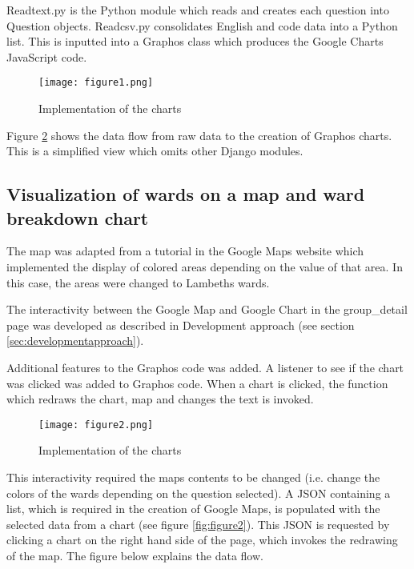 Readtext.py is the Python module which reads and creates each question into Question objects. Readcsv.py consolidates English and code data into a Python list. This is inputted into a Graphos class which produces the Google Charts JavaScript code. 

\begin{figure}[h]
\centering
\texttt{[image: figure1.png]}
\caption{Implementation of the charts}
\label{fig:figure1}
\end{figure}

Figure \ref{fig:figure1} shows the data flow from raw data to the creation of Graphos charts. This is a simplified view which omits other Django modules.

\subsection{Visualization of wards on a map and ward breakdown chart}

The map was adapted from a tutorial in the Google Maps website which implemented the display of colored areas depending on the value of that area. In this case, the areas were changed to Lambeth\textquotesingle s wards.\par

The interactivity between the Google Map and Google Chart in the group\_detail page was developed as described in Development approach (see section \ref{sec:developmentapproach}). \par

Additional features to the Graphos code was added. A listener to see if the chart was clicked was added to Graphos\textsc{} code. When a chart is clicked, the function which redraws the chart, map and changes the text is invoked. \par

\begin{figure}[h]
\centering
\texttt{[image: figure2.png]}
\caption{Implementation of the charts}
\label{fig:figure1}
\end{figure}

This interactivity required the map\textquotesingle s contents to be changed (i.e. change the colors of the wards depending on the question selected). A JSON containing a list, which is required in the creation of Google Maps, is populated with the selected data from a chart (see figure \ref{fig:figure2}). This JSON is requested by clicking a chart on the right hand side of the page, which invokes the redrawing of the map. The figure below explains the data flow.


